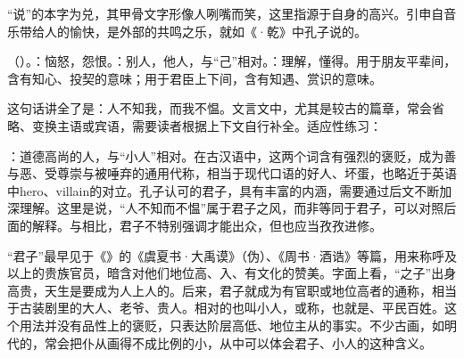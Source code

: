 {“说”的本字为兑，其甲骨文字形像人咧嘴而笑，这里指源于自身的高兴。引申自音乐带给人的愉快，是外部的共鸣之乐，就如《·乾》中孔子说的。

\item {}（）。：恼怒，怨恨。：别人，他人，与“己”相对。：理解，懂得。用于朋友平辈间，含有知心、投契的意味；用于君臣上下间，含有知遇、赏识的意味。

这句话讲全了是：人不知我，而我不愠。文言文中，尤其是较古的篇章，常会省略、变换主语或宾语，需要读者根据上下文自行补全。适应性练习：   

\item {}：道德高尚的人，与“小人”相对。在古汉语中，这两个词含有强烈的褒贬，成为善与恶、受尊崇与被唾弃的通用代称，相当于现代口语的好人、坏蛋，也略近于英语中hero、villain的对立。孔子认可的君子，具有丰富的内涵，需要通过后文不断加深理解。这里是说，“人不知而不愠”属于君子之风，而非等同于君子，可以对照后面的解释。与相比，君子不特别强调才能出众，但也应当孜孜进修。

“君子”最早见于《》的《虞夏书·大禹谟》（伪）、《周书·酒诰》等篇，用来称呼及以上的贵族官员，暗含对他们地位高、入、有文化的赞美。字面上看，“之子”出身高贵，天生是要成为人上人的。后来，君子就成为有官职或地位高者的通称，相当于古装剧里的大人、老爷、贵人。相对的也叫小人，或称，也就是、平民百姓。这个用法并没有品性上的褒贬，只表达阶层高低、地位主从的事实。不少古画，如明代的，常会把仆从画得不成比例的小，从中可以体会君子、小人的这种含义。

}
